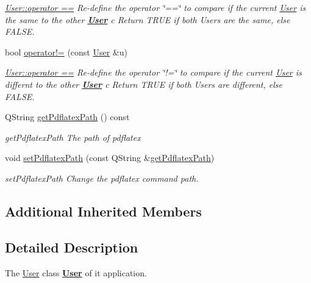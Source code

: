 \begin{DoxyCompactItemize}
\begin{DoxyCompactList}\small\item\em \hyperlink{classModels_1_1User_a60d18c2d1df053f1abf1215414f0b4b6}{User\-::operator ==} Re-\/define the operator \char`\"{}==\char`\"{} to compare if the current \hyperlink{classModels_1_1User}{User} is the same to the other {\bfseries \hyperlink{classModels_1_1User}{User}} {\itshape c} Return T\-R\-U\-E if both Users are the same, else F\-A\-L\-S\-E. \end{DoxyCompactList}\item 
bool \hyperlink{classModels_1_1User_aa1cdb1f752173aedd5f0c43edcb0b10b}{operator!=} (const \hyperlink{classModels_1_1User}{User} \&u)
\begin{DoxyCompactList}\small\item\em \hyperlink{classModels_1_1User_a60d18c2d1df053f1abf1215414f0b4b6}{User\-::operator ==} Re-\/define the operator \char`\"{}!=\char`\"{} to compare if the current \hyperlink{classModels_1_1User}{User} is differnt to the other {\bfseries \hyperlink{classModels_1_1User}{User}} {\itshape c} Return T\-R\-U\-E if both Users are different, else F\-A\-L\-S\-E. \end{DoxyCompactList}\item 
Q\-String \hyperlink{classModels_1_1User_ae8a894050c3e9266518707f6e5cd1c2f}{get\-Pdflatex\-Path} () const 
\begin{DoxyCompactList}\small\item\em get\-Pdflatex\-Path The path of pdflatex \end{DoxyCompactList}\item 
void \hyperlink{classModels_1_1User_ac65a44513c34f7e67888062d8bee3e54}{set\-Pdflatex\-Path} (const Q\-String \&\hyperlink{classModels_1_1User_ae8a894050c3e9266518707f6e5cd1c2f}{get\-Pdflatex\-Path})
\begin{DoxyCompactList}\small\item\em set\-Pdflatex\-Path Change the pdflatex command path. \end{DoxyCompactList}\end{DoxyCompactItemize}
\subsection*{Additional Inherited Members}


\subsection{Detailed Description}
The \hyperlink{classModels_1_1User}{User} class {\bfseries \hyperlink{classModels_1_1User}{User}} of it application. 

